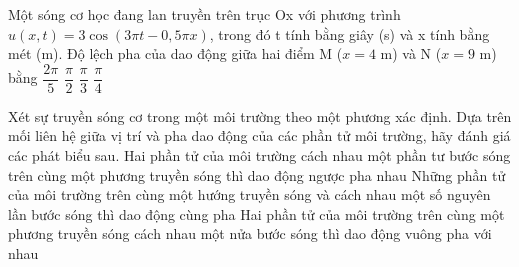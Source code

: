 \begin{ex}%
Một sóng cơ học đang lan truyền trên trục Ox với phương trình\linebreak $u(x, t)=3\cos(3\pi t - 0,5\pi x)$, trong đó t tính bằng giây (s) và x tính bằng mét (m). Độ lệch pha của dao động giữa hai điểm M ($x=4$ m) và N ($x=9$ m) bằng
\choice
{$\dfrac{2\pi}{5}$}
{\True $\dfrac{\pi}{2}$}
{$\dfrac{\pi}{3}$}
{$\dfrac{\pi}{4}$}
\end{ex} 
\begin{ex}%
Xét sự truyền sóng cơ trong một môi trường theo một phương xác định. Dựa trên mối liên hệ giữa vị trí và pha dao động của các phần tử môi trường, hãy đánh giá các phát biểu sau.
{Hai phần tử của môi trường cách nhau một phần tư bước sóng trên cùng một phương truyền sóng thì dao động ngược pha nhau}
{\True Những phần tử của môi trường trên cùng một hướng truyền sóng và cách nhau một số nguyên lần bước sóng thì dao động cùng pha}
{Hai phần tử của môi trường trên cùng một phương truyền sóng cách nhau một nửa bước sóng thì dao động vuông pha với nhau}
\end{ex} 
